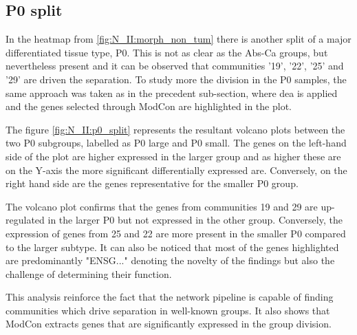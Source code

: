 \subsection{P0 split} \label{s:N_II:p0_split}

In the heatmap from \cref{fig:N_II:morph_non_tum} there is another split of a major differentiated tissue type, P0. This is not as clear as the Abs-Ca groups, but nevertheless present and it can be observed that communities '19', '22', '25' and '29' are driven the separation. To study more the division in the P0 samples, the same approach was taken as in the precedent sub-section, where \acrshort{dea} is applied and the genes selected through ModCon are highlighted in the plot.

The figure \cref{fig:N_II:p0_split} represents the resultant volcano plots between the two P0 subgroups, labelled as P0 large and P0 small. The genes on the left-hand side of the plot are higher expressed in the larger group and as higher these are on the Y-axis the more significant differentially expressed are. Conversely, on the right hand side are the genes representative for the smaller P0 group.

The volcano plot confirms that the genes from communities 19 and 29 are up-regulated in the larger P0 but not expressed in the other group. Conversely, the expression of genes from 25 and 22 are more present in the smaller P0 compared to the larger subtype. It can also be noticed that most of the genes highlighted are predominantly "ENSG..." denoting the novelty of the findings but also the challenge of determining their function. 

This analysis reinforce the fact that the network pipeline is capable of finding communities which drive separation in well-known groups. It also shows that ModCon extracts genes that are significantly expressed in the group division.


